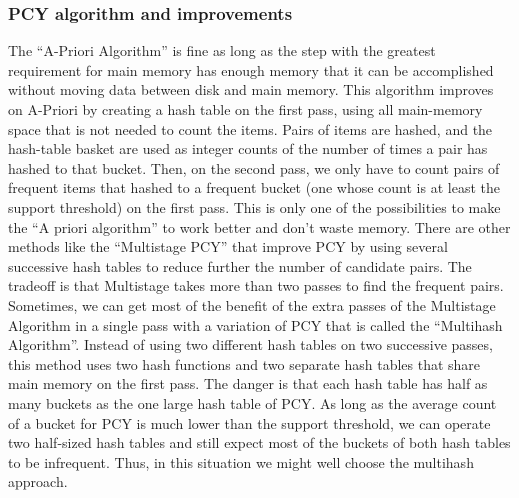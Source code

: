 \documentclass{acm_proc_article-sp-sigmod09}
\begin{document}
	\subsubsection{PCY algorithm and improvements}
	The ``A-Priori Algorithm'' is fine as long as the step with the greatest requirement for main memory has enough
	memory that it can be accomplished without moving
	data between disk and main memory.
	This algorithm improves on A-Priori by creating a hash table on the first pass, using all main-memory space that is not needed to count the items. Pairs of items are hashed, and the hash-table basket are used as integer counts of the number of times a pair has hashed to that bucket. Then, on the second pass, we only have to count pairs of frequent items that hashed to a frequent bucket (one whose count is at least the support threshold) on the first pass.
	This is only one of the possibilities to make the ``A priori algorithm'' to work better and don't waste memory. There are other methods like the ``Multistage PCY'' that improve PCY by using several successive hash tables to reduce further the number of candidate pairs. The tradeoff is that Multistage takes more than two passes to find the frequent pairs. 
	Sometimes, we can get most of the benefit of the extra passes of the Multistage Algorithm in a single pass with a variation of PCY that is called the ``Multihash Algorithm''. Instead of using two different hash tables on two successive passes, this method uses two hash functions and two separate hash tables that share main memory on the first pass. The danger is that each hash table has half as many buckets as the one large hash table of PCY. As long as the average count of a bucket for PCY is much lower than the support threshold, we can operate two half-sized hash tables and still expect most of the buckets of both hash tables to be infrequent. Thus, in this situation we might well choose the multihash approach.
	
\end{document}
